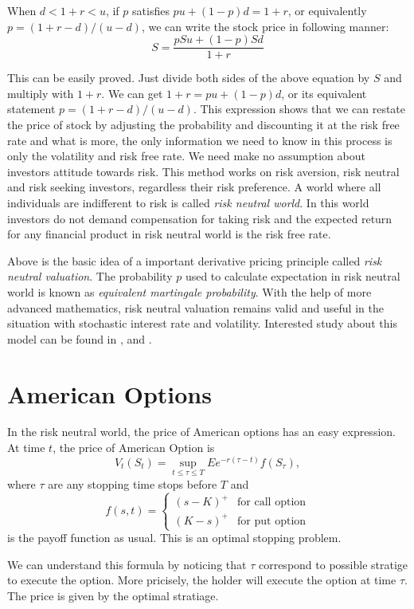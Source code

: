 \documentclass[12pt,oneside,titlepage]{book}
\begin{document}
When $d < 1+r <u$, if $p$ satisfies $pu+(1-p)d= 1+r$, or equivalently $p=(1+r-d)/(u-d)$, we can write the stock price in following manner: 
\begin{equation}
S=\frac{pSu+(1-p)Sd}{1+r}
\end{equation}

This can be easily proved. Just divide both sides of the above equation by $S$ and multiply with $1+r$. We can get $1+r = pu +(1-p)d$, or its equivalent statement $p=(1+r-d)/(u-d)$. This expression shows that we can 
restate the price of stock by adjusting the probability and discounting it at the risk free rate and what is more,     the only information we need to know in this process is only the volatility and risk free rate. We need make no assumption about investors attitude towards risk. This method works on risk aversion, risk neutral and risk seeking investors, regardless their risk preference. A world where all individuals are indifferent to risk is called {\it risk neutral world}. In this world investors do not demand compensation for taking risk and the expected return for any financial product in risk neutral world is the risk free rate.

Above is the basic idea of a important derivative pricing principle called {\it risk neutral valuation}. The probability $p$ used to calculate expectation in risk neutral world is known as {\it equivalent martingale probability}. With the help of more advanced mathematics, risk neutral valuation remains valid and useful in the situation with stochastic interest rate and volatility. Interested study about this model can be found in \cite{HarrisonKreps1979}, \cite{Harrison1981} and \cite{Kreps1981}.



\section{American Options}
In the risk neutral world, the price of American options has an easy 
expression. At time $t$, the price of American Option is
\[
V_t(S_t) =\sup_{t\leq \tau\leq  T}Ee^{-r(\tau-t)}f(S_\tau),
\]
where $\tau$ are any stopping time stops before $T$ and
\[
f(s,t) = 
\begin{cases}
(s-K)^+ & \text{for call option}\\
(K-s)^+ & \text{for put option}
\end{cases}
\]
is the payoff function as usual.
This is an optimal stopping problem. 

We can understand this formula by noticing that $\tau$ correspond to possible 
stratige to execute the option. 
More pricisely, the holder will execute the option at time $\tau$.
The price is given by the optimal stratiage. 
\end{document}
